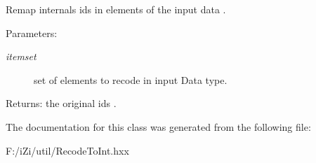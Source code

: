 Remap internals ids in elements of the input data . 

\begin{Desc}
\item[Parameters:]
\begin{description}
\item[{\em itemset}]set of elements to recode in input Data type. \end{description}
\end{Desc}
\begin{Desc}
\item[Returns:]the original ids . \end{Desc}


The documentation for this class was generated from the following file:\begin{CompactItemize}
\item 
F:/i\-Zi/util/Recode\-To\-Int.hxx\end{CompactItemize}

